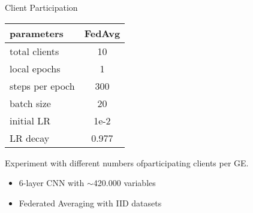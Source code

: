 
\begin{frame}{Client Participation}
	\begin{minipage}{0.4\textwidth}
        \begin{table}[H]
            \center
            \begin{tabular}{ | l | c | }
                \hline
                parameters      & FedAvg \\\hline
                total clients   & 10 \\\hline
                local epochs    & 1\\\hline
                steps per epoch & 300\\\hline
                batch size      & 20\\\hline
                initial LR      & 1e-2\\\hline
                LR decay        & 0.977\\\hline
            \end{tabular}
        \end{table}
	\end{minipage}%
	\begin{minipage}{0.6\textwidth}
	    \hspace{0.35cm}Experiment with different numbers of\newline\hspace*{0.35cm}participating clients per GE.
    	\begin{itemize}
    	    \item 6-layer CNN with $\sim$420.000 variables
    	    \item Federated Averaging with IID datasets
    	\end{itemize}
	\end{minipage}%
\end{frame}

